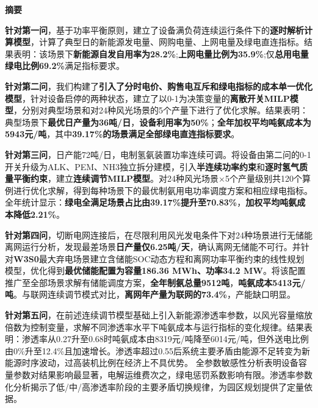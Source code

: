 \documentclass[zihao=-4,a4paper]{ctexart} %
\renewenvironment{abstract}{%
	\begin{center}
		\bfseries \zihao{4} 摘要
	\end{center}
	\small
}{%
	\par
}
\begin{document}
	\begin{abstract}
		
		\normalsize{
			\setlength{\parindent}{2em}
			\textbf{针对第一问}，基于功率平衡原则，建立了设备满负荷连续运行条件下的\textbf{逐时解析计算模型}，计算了典型日的新能源发电量、网购电量、上网电量及绿电直连指标。结果表明：该场景下\textbf{新能源自发自用率为28.2\%};\textbf{上网电量比例为35.9\%};仅\textbf{总用电量绿电比例69.2\%}满足指标要求。
			
			\textbf{针对第二问}，我们构建了\textbf{引入了分时电价、购售电互斥和绿电指标的成本单一优化模型}，针对设备启停的两种状态，建立了以0-1为决策变量的\textbf{离散开关MILP模型}，分别对典型场景和对24种风光场景的5个产量下进行了优化求解。结果表明：典型场景下\textbf{最优日产量为36吨/日}，\textbf{设备利用率为50\%}；\textbf{全年加权平均吨氨成本为5943元/吨}，其中\textbf{39.17\%的场景满足全部绿电直连指标要求}。
			
			\textbf{针对第三问}，日产能72吨/日，电制氢氨装置功率连续可调。将设备由第二问的0-1开关升级为ALK、PEM、NH3独立拆分建模，引入\textbf{半连续功率约束}和\textbf{逐时氢气质量平衡约束}，建立\textbf{连续调节MILP模型}。对24种风光场景×5个产量级别共120个算例进行优化求解，得到每种场景下的最优制氨用电功率调度方案和相应绿电指标。全年统计显示：\textbf{绿电全满足场景占比由39.17\%提升至70.83\%}，\textbf{加权平均吨氨成本降低2.21\%}。
			
			\textbf{针对第四问}，切断电网连接后，在尽限利用风光发电条件下对24种场景进行无储能离网运行分析，发现最差场景\textbf{日产量仅6.25吨/天}，确认离网无储能不可行。并针对\textbf{W3S0}最大弃电场景建立含储能SOC动态方程和离网功率平衡约束的线性规划模型，优化得到\textbf{最优储能配置为容量186.36 MWh、功率34.2 MW}。将该配置推广至全部场景求解有储能调度方案，\textbf{全年制氨总量9512吨}，\textbf{吨氨成本5413元/吨}。与联网连续调节模式对比，\textbf{离网年产量为联网的73.4\%}，产能缺口明显。
			
			\textbf{针对第五问}，在前述连续调节模型基础上引入新能源渗透率参数，以风光容量缩放倍数为控制变量，求解不同渗透率水平下吨氨成本与运行指标的变化规律。结果表明：渗透率从0.27升至0.68时吨氨成本由8319元/吨降至6014元/吨，但外送电比例由0\%升至12.4\%且加速增长。渗透率超过0.55后系统主要矛盾由能源不足转变为新能源时序波动，过高装机比例在经济上不具优势。
			全参数敏感性分析表明设备容量参数对结果影响最显著，电解运维费次之，绿电惩罚系数影响有限。渗透率参数化分析揭示了低/中/高渗透率阶段的主要矛盾切换规律，为园区规划提供了定量依据。
			
		}
	\end{abstract}
	\vspace{0.5cm}
	
\end{document}
